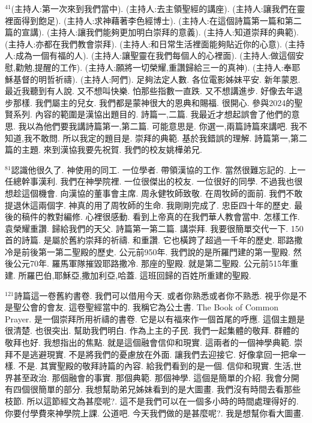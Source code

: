 \documentclass{book}
\begin{document}
$^{41}$(主持人:第一次來到我們當中).
(主持人:去主領聖經的講座).
(主持人:讓我們在靈裡面得到飽足).
(主持人:求神藉著李色經博士).
(主持人:在這個詩篇第一篇和第二篇的宣講).
(主持人:讓我們能夠更加明白崇拜的意義).
(主持人:知道崇拜的典範).
(主持人:亦都在我們教會崇拜).
(主持人:和日常生活裡面能夠貼近你的心意).
(主持人:成為一個有福的人).
(主持人:讓聖靈在我們每個人的心裡面).
(主持人:做這個安慰,勸勉,提醒的工作).
(主持人:願將一切榮耀,重讚歸給三一的真神).
(主持人:奉耶穌基督的明哲祈禱).
(主持人:阿們).
足夠法定人數.
各位電影姊妹平安.
新年蒙恩.
最近我聽到有人說.
又不想叫快樂.
怕那些指數一直跌.
又不想講進步.
好像去年退步那樣.
我們屬主的兒女.
我們都是蒙神很大的恩典和賜福.
很開心.
參與2024的聖賢系列.
內容的範圍是漢協出題目的.
詩篇一,二篇.
我最近才想起誤會了他們的意思.
我以為他們要我講詩篇第一,第二篇.
可能意思是.
你選一,兩篇詩篇來講吧.
我不知道,我不敢問.
所以我定的題目是.
崇拜的典範.
基於我錯誤的理解.
詩篇第一,第二篇的主題.
來到漢協我要先祝賀.
我們的校友姚樺弟兄.

$^{81}$認識他很久了.
神使用的同工.
一位學者.
帶領漢協的工作.
當然很難忘記的.
上一任總幹事漢利.
我們在神學院裡.
一位很傑出的校友.
一位很好的同學.
不過我也很想趁這個機會.
向漢協的董事會主席.
周永健牧師致敬.
在周牧師的面前.
我們不敢提退休這兩個字.
神真的用了周牧師的生命.
我剛剛完成了.
忠臣四十年的歷史.
最後的稿件的教對編修.
心裡很感動.
看到上帝真的在我們華人教會當中.
怎樣工作.
袁榮耀重讚.
歸給我們的天父.
詩篇第一第二篇.
講崇拜.
我要很簡單交代一下.
150首的詩篇.
是屬於舊約崇拜的祈禱.
和重讚.
它也橫跨了超過一千年的歷史.
耶路撒冷是前後第一第二聖殿的歷史.
公元前950年.
我們說的是所羅門建的第一聖殿.
然後公元70年.
羅馬軍隊摧毀耶路撒冷.
那座的聖殿.
就是第二聖殿.
公元前515年重建.
所羅巴伯,耶穌亞,撒加利亞,哈蓋.
這班回歸的百姓所重建的聖殿.

$^{121}$詩篇這一卷舊約書卷.
我們可以借用今天.
或者你熟悉或者你不熟悉.
視乎你是不是聖公會的會友.
這卷聖經當中的.
我稱它為公土書.
The Book of Common Prayer.
是一個崇拜所用祈禱的書卷.
它是以有福來作一個首尾的呼應.
這個主題是很清楚.
也很突出.
幫助我們明白.
作為上主的子民.
我們一起集體的敬拜.
群體的敬拜也好.
我想指出的焦點.
就是這個融會信仰和現實.
這兩者的一個神學典範.
崇拜不是逃避現實.
不是將我們的憂慮放在外面.
讓我們去迎接它.
好像拿回一把傘一樣.
不是.
其實聖殿的敬拜詩篇的內容.
給我們看到的是一個.
信仰和現實.
生活,世界甚至政治.
那個融會的事實.
那個典範.
那個神學.
這個是簡單的介紹.
我會分開有四個很簡單的部分.
我想幫助弟兄姊妹看到的是大圖畫.
我們沒有時間去看那些枝節.
所以這節經文為甚麼呢?.
這不是我們可以在一個多小時的時間處理得好的.
你要付學費來神學院上課.
公道吧.
今天我們做的是甚麼呢?.
我是想幫你看大圖畫.
\end{document}
